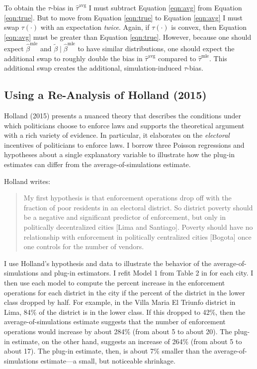 \documentclass[12pt]{article}
\begin{document}
To obtain the $\tau$-bias in $\hat{\tau}^\text{avg}$ I must subtract Equation \ref{eqn:avg} from Equation \ref{eqn:true}.
But to move from Equation \ref{eqn:true} to Equation \ref{eqn:avg} I must swap $\tau(\cdot)$ with an expectation \emph{twice}.
Again, if $\tau(\cdot)$ is convex, then Equation \ref{eqn:avg} must be greater than Equation \ref{eqn:true}.
However, because one should expect $\hat{\beta}^\text{mle}$ and $\tilde{\beta} \mid \hat{\beta}^\text{mle}$ to have similar distributions, one should expect the additional swap to roughly double the bias in $\hat{\tau}^\text{avg}$ compared to $\hat{\tau}^\text{mle}$. This additional swap creates the additional, simulation-induced $\tau$-bias.

\subsection*{Using a Re-Analysis of Holland (2015)}

Holland (2015) presents a nuanced theory that describes the conditions under which politicians choose to enforce laws and supports the theoretical argument with a rich variety of evidence. In particular, it elaborates on the \textit{electoral} incentives of politicians to enforce laws. I borrow three Poisson regressions and hypotheses about a single explanatory variable to illustrate how the plug-in estimates can differ from the average-of-simulations estimate.

Holland writes: 
\begin{quote}
My first hypothesis is that enforcement operations drop off with the fraction of poor residents in an electoral district. So district poverty should be a negative and significant predictor of enforcement, but only in politically decentralized cities [Lima and Santiago]. Poverty should have no relationship with enforcement in politically centralized cities [Bogota] once one controls for the number of vendors.
\end{quote}

I use Holland's hypothesis and data to illustrate the behavior of the average-of-simulations and plug-in estimators. I refit Model 1 from Table 2 in \cite{Holland2015} for each city. I then use each model to compute the percent increase in the enforcement operations for each district in the city if the percent of the district in the lower class dropped by half. For example, in the Villa Maria El Triunfo district in Lima, 84\% of the district is in the lower class. If this dropped to 42\%, then the average-of-simulations estimate suggests that the number of enforcement operations would increase by about 284\% (from about 5 to about 20). The plug-in estimate, on the other hand, suggests an increase of 264\% (from about 5 to about 17). The plug-in estimate, then, is about 7\% smaller than the average-of-simulations estimate---a small, but noticeable shrinkage. 
\end{document}
